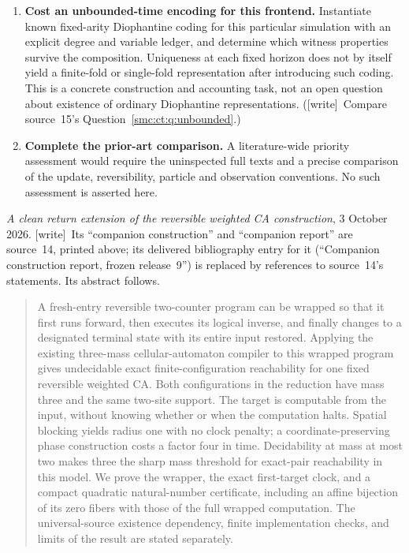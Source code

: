 \documentclass[11pt,letterpaper]{article}
\numberwithin{equation}{section}
\theoremstyle{definition}
\theoremstyle{remark}
\newcommand{\wtag}{\textup{[write]}}
\begin{document}
\begin{enumerate}
\item\label{smc:tm:q:unbounded} \textbf{Cost an unbounded-time encoding for this frontend.} Instantiate known fixed-arity Diophantine coding for this particular simulation with an explicit degree and variable ledger, and determine which witness properties survive the composition. Uniqueness at each fixed horizon does not by itself yield a finite-fold or single-fold representation after introducing such coding. This is a concrete construction and accounting task, not an open question about existence of ordinary Diophantine representations. (\wtag\ Compare source~15's Question~\ref{smc:ct:q:unbounded}.)
\item\label{smc:tm:q:priorart} \textbf{Complete the prior-art comparison.} A literature-wide priority assessment would require the uninspected full texts and a precise comparison of the update, reversibility, particle and observation conventions. No such assessment is asserted here.
\end{enumerate}

\bigskip
{}
\par
\noindent\emph{A clean return extension of the reversible weighted CA construction}, 3 October 2026. \wtag\ Its ``companion construction'' and ``companion report'' are source~14, printed above; its delivered bibliography entry for it (``Companion construction report, frozen release~9'') is replaced by references to source~14's statements. Its abstract follows.
\begin{quote}\small
A fresh-entry reversible two-counter program can be wrapped so that it first runs forward, then executes its logical inverse, and finally changes to a designated terminal state with its entire input restored. Applying the existing three-mass cellular-automaton compiler to this wrapped program gives undecidable exact finite-configuration reachability for one fixed reversible weighted CA. Both configurations in the reduction have mass three and the same two-site support. The target is computable from the input, without knowing whether or when the computation halts. Spatial blocking yields radius one with no clock penalty; a coordinate-preserving phase construction costs a factor four in time. Decidability at mass at most two makes three the sharp mass threshold for exact-pair reachability in this model. We prove the wrapper, the exact first-target clock, and a compact quadratic natural-number certificate, including an affine bijection of its zero fibers with those of the full wrapped computation. The universal-source existence dependency, finite implementation checks, and limits of the result are stated separately.
\end{quote}
\end{document}
